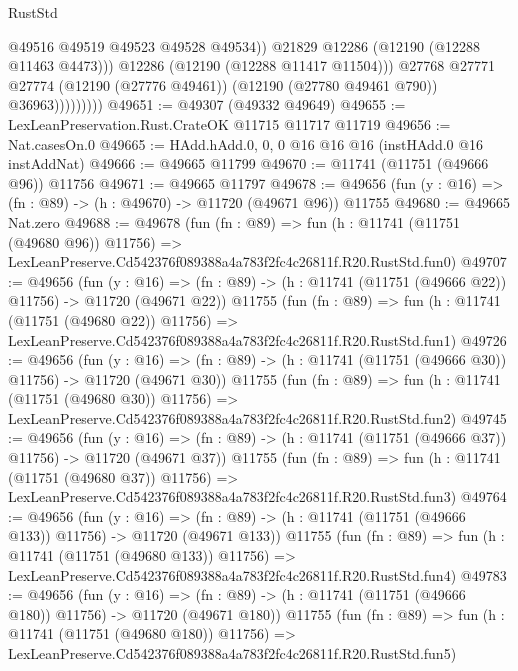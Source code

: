 \begin{lexlean}{RustStd}
\begin{coremodule}
                              @49516
                              @49519
                              @49523
                              @49528
                              @49534))
                          @21829
                          @12286
                          (@12190 (@12288 @11463 @4473)))
                        @12286
                        (@12190 (@12288 @11417 @11504)))
                      @27768
                      @27771
                      @27774
                      (@12190 (@27776 @49461))
                      (@12190 (@27780 @49461 @790))
                      @36963)))))))))
@49651 := @49307 (@49332 @49649)
@49655 := LexLeanPreservation.Rust.CrateOK @11715 @11717 @11719
@49656 := Nat.casesOn.{0}
@49665 := HAdd.hAdd.{0, 0, 0} @16 @16 @16 (instHAdd.{0} @16 instAddNat)
@49666 := @49665 @11799
@49670 := @11741 (@11751 (@49666 @96)) @11756
@49671 := @49665 @11797
@49678 := @49656 (fun (y : @16) => (fn : @89) -> (h : @49670) -> @11720 (@49671 @96)) @11755
@49680 := @49665 Nat.zero
@49688 := @49678
    (fun (fn : @89) =>
    fun (h : @11741 (@11751 (@49680 @96)) @11756) =>
    LexLeanPreserve.Cd542376f089388a4a783f2fc4c26811f.R20.RustStd.fun0)
@49707 := @49656
    (fun (y : @16) =>
    (fn : @89) -> (h : @11741 (@11751 (@49666 @22)) @11756) -> @11720 (@49671 @22))
    @11755
    (fun (fn : @89) =>
    fun (h : @11741 (@11751 (@49680 @22)) @11756) =>
    LexLeanPreserve.Cd542376f089388a4a783f2fc4c26811f.R20.RustStd.fun1)
@49726 := @49656
    (fun (y : @16) =>
    (fn : @89) -> (h : @11741 (@11751 (@49666 @30)) @11756) -> @11720 (@49671 @30))
    @11755
    (fun (fn : @89) =>
    fun (h : @11741 (@11751 (@49680 @30)) @11756) =>
    LexLeanPreserve.Cd542376f089388a4a783f2fc4c26811f.R20.RustStd.fun2)
@49745 := @49656
    (fun (y : @16) =>
    (fn : @89) -> (h : @11741 (@11751 (@49666 @37)) @11756) -> @11720 (@49671 @37))
    @11755
    (fun (fn : @89) =>
    fun (h : @11741 (@11751 (@49680 @37)) @11756) =>
    LexLeanPreserve.Cd542376f089388a4a783f2fc4c26811f.R20.RustStd.fun3)
@49764 := @49656
    (fun (y : @16) =>
    (fn : @89) -> (h : @11741 (@11751 (@49666 @133)) @11756) -> @11720 (@49671 @133))
    @11755
    (fun (fn : @89) =>
    fun (h : @11741 (@11751 (@49680 @133)) @11756) =>
    LexLeanPreserve.Cd542376f089388a4a783f2fc4c26811f.R20.RustStd.fun4)
@49783 := @49656
    (fun (y : @16) =>
    (fn : @89) -> (h : @11741 (@11751 (@49666 @180)) @11756) -> @11720 (@49671 @180))
    @11755
    (fun (fn : @89) =>
    fun (h : @11741 (@11751 (@49680 @180)) @11756) =>
    LexLeanPreserve.Cd542376f089388a4a783f2fc4c26811f.R20.RustStd.fun5)

\end{coremodule}
\end{lexlean}
